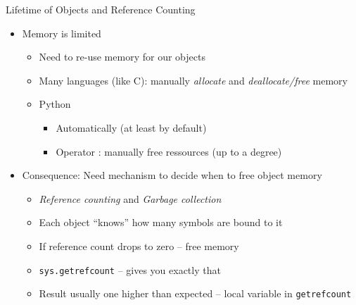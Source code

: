 \begin{frame}{Lifetime of Objects and Reference Counting}
%
\begin{itemize}
\item Memory is limited
	\begin{itemize}
	\item[\Thus] Need to re-use memory for our objects
	\item Many languages (like \zB C): manually \emph{allocate} and \emph{deallocate/free} memory
	\item Python
		\begin{itemize}
		\item Automatically (at least by default)
		\item Operator : manually free ressources (up to a degree)
		\end{itemize}
	\end{itemize}
\item Consequence: Need mechanism to decide when to free object memory
	\begin{itemize}
	\item[\Thus] \emph{Reference counting} and \emph{Garbage collection}
	\item Each object \enquote{knows} how many symbols are bound to it
	\item If reference count drops to zero -- free memory
	\item \texttt{sys.getrefcount} -- gives you exactly that
	\item Result usually one higher than expected -- local variable in \texttt{getrefcount}
	\end{itemize}
\end{itemize}
%
\end{frame}



